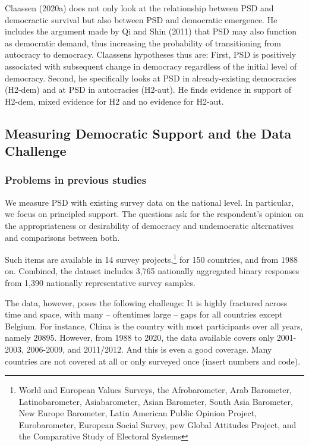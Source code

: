 \documentclass[12pt,english,a4paper,oneside]{article}
\theoremstyle{definition}
\theoremstyle{definition}
\theoremstyle{definition}
\theoremstyle{definition}
\theoremstyle{remark}
\begin{document}
Claassen (2020a) does not only look at the relationship between PSD and democractic survival but also between PSD and democratic emergence. He includes the argument made by Qi and Shin (2011) that PSD may also function as democratic demand, thus increasing the probability of transitioning from autocracy to democracy. Claassens hypotheses thus are: First, PSD is positively associated with subsequent change in democracy regardless of the initial level of democracy. Second, he specifically looks at PSD in already-existing democracies (H2-dem) and at PSD in autocracies (H2-aut). He finds evidence in support of H2-dem, mixed evidence for H2 and no evidence for H2-aut.

\hypertarget{measuring-democratic-support-and-the-data-challenge}{%
\subsection{Measuring Democratic Support and the Data Challenge}\label{measuring-democratic-support-and-the-data-challenge}}

\hypertarget{problems-in-previous-studies}{%
\subsubsection{Problems in previous studies}\label{problems-in-previous-studies}}

We measure PSD with existing survey data on the national level. In particular, we focus on principled support. The questions ask for the respondent's opinion on the appropriateness or desirability of democracy and undemocratic alternatives and comparisons between both.

Such items are available in 14 survey projects,\footnote{World and European Values Surveys, the Afrobarometer, Arab Barometer, Latinobarometer, Asiabarometer, Asian Barometer, South Asia Barometer, New Europe Barometer, Latin American Public Opinion Project, Eurobarometer, European Social Survey, pew Global Attitudes Project, and the Comparative Study of Electoral Systems} for 150 countries, and from 1988 on. Combined, the dataset includes 3,765 nationally aggregated binary responses from 1,390 nationally representative survey samples.

The data, however, poses the following challenge: It is highly fractured across time and space, with many -- oftentimes large -- gaps for all countries except Belgium. For instance, China is the country with most participants over all years, namely 20895. However, from 1988 to 2020, the data available covers only 2001-2003, 2006-2009, and 2011/2012. And this is even a good coverage. Many countries are not covered at all or only surveyed once (insert numbers and code).
\end{document}
